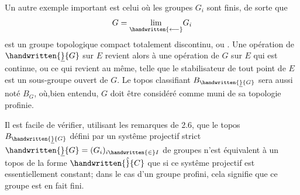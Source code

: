  Un autre exemple important est celui où les groupes $G_i$ sont finis, de sorte que
\[
G=\underset{\handwritten{\longleftarrow}}{\lim}G_i
\]
est un groupe topologique compact totalement discontinu, ou . Une opération de $\handwritten{\underline}{G}$ sur $E$ revient alors à une opération de $G$ sur $E$ qui est continue, ou ce qui revient au même, telle que le stabilisateur de tout point de $E$ est un sous-groupe ouvert de $G$. Le topos classifiant $B_{\handwritten{\underline}{G}}$ sera aussi noté $B_G$, où,bien entendu, $G$ doit être considéré comme muni de sa topologie profinie.

 Il est facile de vérifier, utilisant les remarques de 2.6, que le topos $B_{\handwritten{\underline}{G}}$ défini par un systême projectif strict  $\handwritten{\underline}{G}=(G_i)_{i\handwritten{\in}I}$ de groupes n'est équivalent à un topos de la forme $\handwritten{\hat}{C}$ que si ce systême projectif est essentiellement constant; dans le cas d'un groupe profini, cela signifie que ce groupe est en fait fini.
